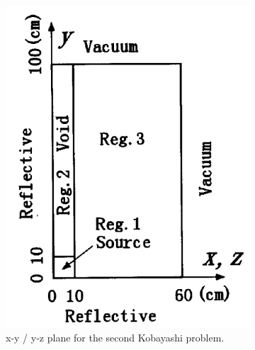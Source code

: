 \begin{figure}[H]
    \centering
    \begin{subfigure}[b]{0.45\textwidth}
        \centering
        \includegraphics[width=\textwidth]{images/verification/sn_kobayashi/geometry/2_geo_1.png}
        \caption{x-y / y-z plane for the second Kobayashi problem.}
        \label{fig:verification:sn_kobayashi_2_geo:1}
    \end{subfigure}
    \hfill
    \begin{subfigure}[b]{0.45\textwidth}
        \centering

\end{subfigure}
\end{figure}
